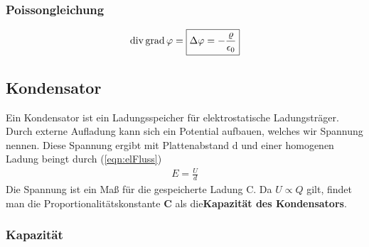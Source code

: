\subsubsection{Poissongleichung}\begin{align}\label{eqn:Poissongleichung}
\mathrm{div\,} \mathrm{grad\,} \varphi = \boxed{\Delta \varphi = -\frac{\varrho}{\epsilon_0}}
\end{align}
\subsection{Kondensator}Ein Kondensator ist ein Ladungsspeicher für elektrostatische Ladungsträger. Durch externe Aufladung kann sich ein Potential aufbauen, welches wir Spannung nennen. Diese Spannung ergibt mit  Plattenabstand d und einer homogenen Ladung beingt durch (\ref{eqn:elFluss})\begin{align}
E = \frac{U}{d}
\end{align}Die Spannung ist ein Maß für die gespeicherte Ladung C. Da $U \propto Q$ gilt, findet man die Proportionalitätskonstante \textbf{C} als die\textbf{Kapazität des Kondensators}.
\subsubsection{Kapazität}